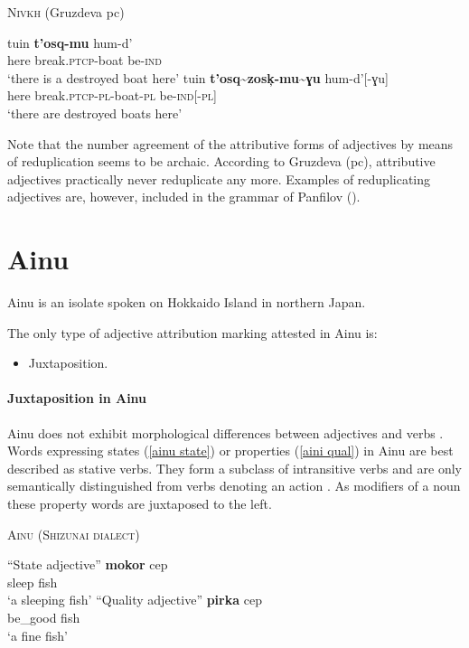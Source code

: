 \begin{exe}
\ex \textsc{Nivkh} (Gruzdeva pc) \label{nivkh redup}
\begin{xlist}
\ex 
\gll	tuin \textbf{t'osq-mu} hum-d'\\
	here break.\textsc{ptcp}-boat be-\textsc{ind}\\
\glt	‘there is a destroyed boat here’ 
\ex	\label{nivkh unaltered}
\gll	tuin \textbf{t'osq\textasciitilde zosk̦-mu\textasciitilde ɣu} hum-d'[-ɣu]\\
	here break.\textsc{ptcp}-\textsc{pl}-boat-\textsc{pl} be-\textsc{ind}[-\textsc{pl}]\\
\glt	‘there are destroyed boats here’
\end{xlist}
\end{exe}
Note that the number agreement of the attributive forms of adjectives by means of reduplication seems to be archaic. According to Gruzdeva (pc), attributive adjectives practically never reduplicate any more. Examples of reduplicating adjectives are, however, included in the grammar of Panfilov (\citeyear{panfilov1965}).

\section{Ainu}
Ainu is an isolate spoken on Hokkaido Island in northern Japan.

The only type of adjective attribution marking attested in Ainu is:
\begin{itemize}
\item Juxtaposition.
\end{itemize}

\paragraph{Juxtaposition in Ainu}
\label{ainu synchr}
Ainu does not exhibit morphological differences between adjectives and verbs \citep[27]{refsing1986}. Words expressing states (\ref{ainu state}) or properties (\ref{aini qual}) in Ainu are best described as stative verbs. They form a subclass of intransitive verbs and are only semantically distinguished from verbs denoting an action \cite[141–142]{refsing1986}. As modifiers of a noun these property words are juxtaposed to the left.
\begin{exe}
\ex \textsc{Ainu (Shizunai dialect)} \cite[142]{refsing1986}%
\begin{xlist}
\ex “State adjective” \label{ainu state}
\gll	\textbf{mokor} cep\\
	sleep fish\\
\glt	‘a sleeping fish’
\ex “Quality adjective” \label{aini qual}
\gll	\textbf{pirka} cep\\
	be\_good fish\\
\glt	‘a fine fish’
\end{xlist}
\end{exe}

